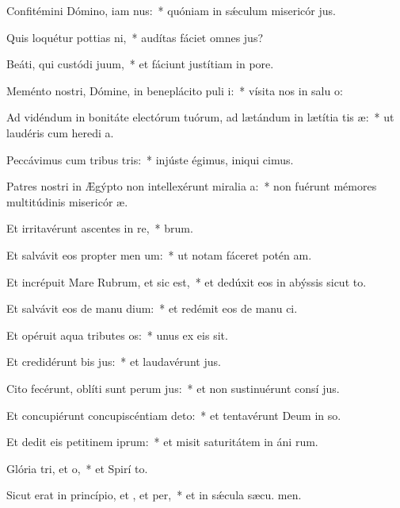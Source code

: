 \item Confitémini Dómino, iam nus:~* quóniam in sǽculum misericór jus.
\item Quis loquétur pottias ni,~* audítas fáciet omnes  jus?
\item Beáti, qui custódi juum,~* et fáciunt justítiam in  pore.
\item Meménto nostri, Dómine, in beneplácito puli i:~* vísita nos in salu o:
\item Ad vidéndum in bonitáte electórum tuórum, ad lætándum in lætítia tis æ:~* ut laudéris cum heredi a.
\item Peccávimus cum tribus tris:~* injúste égimus, iniqui cimus.
\item Patres nostri in Ægýpto non intellexérunt miralia a:~* non fuérunt mémores multitúdinis misericór æ.
\item Et irritavérunt ascentes in re,~*  brum.
\item Et salvávit eos propter men um:~* ut notam fáceret potén am.
\item Et incrépuit Mare Rubrum, et sic est,~* et dedúxit eos in abýssis sicut  to.
\item Et salvávit eos de manu dium:~* et redémit eos de manu ci.
\item Et opéruit aqua tributes os:~* unus ex eis  sit.
\item Et credidérunt bis jus:~* et laudavérunt  jus.
\item Cito fecérunt, oblíti sunt perum jus:~* et non sustinuérunt consí jus.
\item Et concupiérunt concupiscéntiam  deto:~* et tentavérunt Deum in so.
\item Et dedit eis petitinem iprum:~* et misit saturitátem in áni rum.
\item Glória tri, et o,~* et Spirí to.
\item Sicut erat in princípio, et , et per,~* et in sǽcula sæcu. men.
